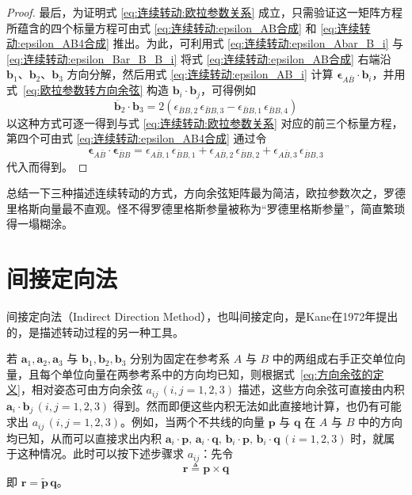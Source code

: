 \begin{proof}
最后，为证明式 \eqref{eq:连续转动:欧拉参数关系} 成立，只需验证这一矩阵方程所蕴含的四个标量方程可由式 \eqref{eq:连续转动:epsilon_AB合成} 和 \eqref{eq:连续转动:epsilon_AB4合成} 推出。为此，可利用式 \eqref{eq:连续转动:epsilon_Abar_B_i} 与 \eqref{eq:连续转动:epsilon_Bar_B_B_i} 将式 \eqref{eq:连续转动:epsilon_AB合成} 右端沿 $\mathbf{b}_1$、$\mathbf{b}_2$、$\mathbf{b}_3$ 方向分解，然后用式 \eqref{eq:连续转动:epsilon_AB_i} 计算 $\bm{\epsilon}_{A\bar B}\cdot\mathbf{b}_i$，并用式~\eqref{eq:欧拉参数转方向余弦} 构造 $\mathbf{b}_i\cdot\mathbf{b}_j$，可得例如
$$
\overline{\mathbf{b}}_2\cdot\mathbf{b}_3=2(\epsilon_{\bar B B,2}\,\epsilon_{\bar B B,3}-\epsilon_{\bar B B,1}\,\epsilon_{\bar B B,4})
$$
以这种方式可逐一得到与式 \eqref{eq:连续转动:欧拉参数关系} 对应的前三个标量方程，第四个可由式 \eqref{eq:连续转动:epsilon_AB4合成} 通过令
$$
\bm{\epsilon}_{A\bar B}\cdot\bm{\epsilon}_{\bar B B}=\epsilon_{A\bar B,1}\,\epsilon_{\bar B B,1}+\epsilon_{A\bar B,2}\,\epsilon_{\bar B B,2}+\epsilon_{A\bar B,3}\,\epsilon_{\bar B B,3}
$$
代入而得到。

\end{proof}

总结一下三种描述连续转动的方式，方向余弦矩阵最为简洁，欧拉参数次之，罗德里格斯向量最不直观。怪不得罗德里格斯参量被称为“罗德里格斯参量”，简直繁琐得一塌糊涂。
\section{间接定向法}\label{sec:indirect-orientation}
间接定向法（Indirect Direction Method），也叫间接定向，是Kane在1972年提出的，是描述转动过程的另一种工具。

若 $\mathbf{a}_1,\mathbf{a}_2,\mathbf{a}_3$ 与 $\mathbf{b}_1,\mathbf{b}_2,\mathbf{b}_3$ 分别为固定在参考系 $A$ 与 $B$ 中的两组成右手正交单位向量，且每个单位向量在两参考系中的方向均已知，则根据式~\eqref{eq:方向余弦的定义}，相对姿态可由方向余弦 $a_{ij}\,(i,j=1,2,3)$ 描述，这些方向余弦可直接由内积 $\mathbf{a}_i\cdot\mathbf{b}_j\,(i,j=1,2,3)$ 得到。然而即便这些内积无法如此直接地计算，也仍有可能求出 $a_{ij}\,(i,j=1,2,3)$。例如，当两个不共线的向量 $\mathbf{p}$ 与 $\mathbf{q}$ 在 $A$ 与 $B$ 中的方向均已知，从而可以直接求出内积 $\mathbf{a}_i\cdot\mathbf{p},\,\mathbf{a}_i\cdot\mathbf{q},\,\mathbf{b}_i\cdot\mathbf{p},\,\mathbf{b}_i\cdot\mathbf{q}\,(i=1,2,3)$ 时，就属于这种情况。此时可以按下述步骤求 $a_{ij}$：先令
\begin{equation}
    \mathbf{r}\triangleq\mathbf{p}\times\mathbf{q}
    \label{eq:间接定向法:r}
\end{equation}
即 $\mathbf{r}=\tilde{\bm{p}}\,\mathbf{q}$。

